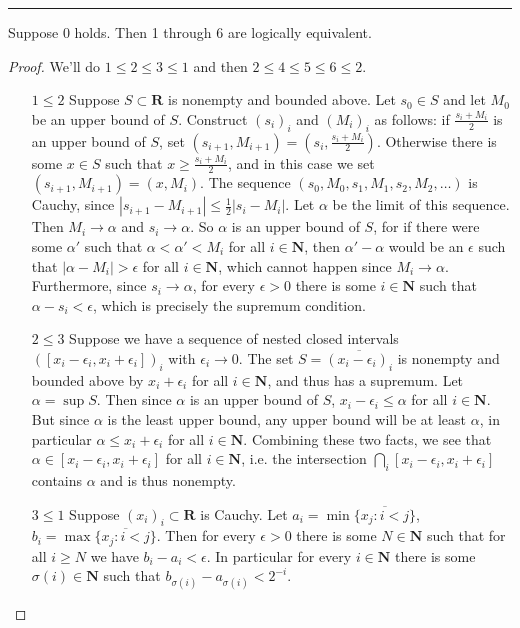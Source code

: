 \documentclass[oneside, 12pt]{memoir}
\theoremstyle{elegant}
\theoremstyle{elegant}
\def\RR{\mathbf R}
\def\NN{\mathbf N}
\begin{document}
\hrule
\begin{thm}
Suppose 0 holds. Then 1 through 6 are logically equivalent.
\end{thm}
\begin{proof} We'll do $1\le 2\le 3\le 1$ and then
$2\le 4\le 5\le 6\le 2$.
\begin{itemize}
\item[$1\le 2$] Suppose $S\subset\RR$ is nonempty and bounded above.
Let $s_0\in S$ and let $M_0$ be an upper bound of $S$.
Construct $(s_i)_i$ and $(M_i)_i$ as follows: if $\frac{s_i + M_i}{2}$
is an upper bound of $S$, set $(s_{i+1}, M_{i+1}) = (s_i, \frac{s_i + M_i}{2})$. Otherwise there is some $x\in S$ such that $x\ge\frac{s_i + M_i}{2}$, and in this case we set $(s_{i+1}, M_{i+1}) = (x, M_i)$.
The sequence $(s_0, M_0, s_1, M_1, s_2, M_2,\dots)$ is Cauchy, since
$|s_{i+1} - M_{i+1}|\le\frac{1}{2}|s_i - M_i|$. Let $\alpha$ be the limit
of this sequence. Then $M_i\to\alpha$ and $s_i\to\alpha$.
So $\alpha$ is an upper bound of $S$, for if there were some $\alpha'$ such that $\alpha < \alpha' < M_i$
for all $i\in\NN$, then $\alpha' - \alpha$ would be an $\epsilon$ such that
$|\alpha - M_i|> \epsilon$ for all $i\in\NN$, which cannot happen since $M_i\to\alpha$.
Furthermore, since $s_i\to\alpha$, for every $\epsilon > 0$ there is
some $i\in\NN$ such that 
$\alpha - s_i < \epsilon$, which is precisely the supremum condition.
\item[$2\le 3$] Suppose we have a sequence of nested closed intervals
$([x_i - \epsilon_i, x_i + \epsilon_i])_i$ with $\epsilon_i\to 0$. The set $S = \overline{(x_i - \epsilon_i)_i}$ is nonempty and bounded above by $x_i + \epsilon_i$ for all $i\in\NN$,
and thus has a supremum. Let $\alpha = \sup S$. Then since $\alpha$ is
an upper bound of $S$, $x_i - \epsilon_i\le \alpha$ for all $i\in\NN$.
But since $\alpha$ is the
least upper bound, any upper bound will be at least $\alpha$,
in particular $\alpha\le x_i + \epsilon_i$ for all $i\in\NN$.
Combining these two facts, we see that $\alpha\in[x_i -\epsilon_i, x_i + \epsilon_i]$
for all $i\in\NN$, i.e. the intersection $\bigcap_i[x_i -\epsilon_i, x_i + \epsilon_i]$ contains $\alpha$
and is thus nonempty.
\vfill\pagebreak
\item[$3\le 1$] Suppose $(x_i)_i\subset\RR$ is Cauchy. Let $a_i = \min\overline{\{x_j : i < j\}}$, $b_i = \max\overline{\{x_j : i < j\}}$.
Then for every $\epsilon > 0$ there is some $N\in\NN$ such that for all $i\ge N$ we have 
$b_i - a_i < \epsilon$. In particular for every $i\in\NN$ there is some
$\sigma(i)\in\NN$ such that $b_{\sigma(i)} - a_{\sigma(i)} < 2^{-i}$.

\end{itemize}
\end{proof}
\end{document}
